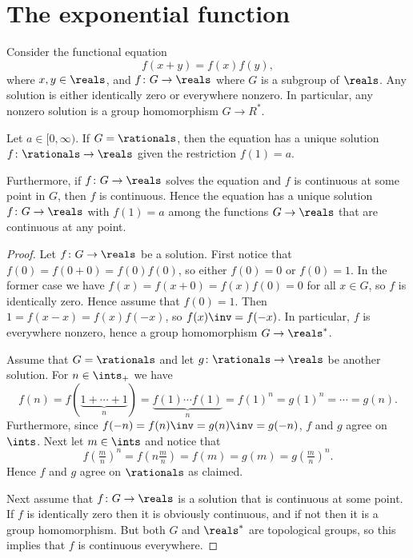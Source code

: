 \documentclass[article, a4paper, 11pt, oneside]{memoir}
\numberwithin{equation}{chapter}
\newcommand{\posints}{\ints_{+}}
\begin{document}
\section{The exponential function}

\begin{lemma}
    Consider the functional equation
    \begin{equation*}
        f(x+y) = f(x)f(y),
    \end{equation*}
    where $x,y \in \reals$, and $f \colon G \to \reals$ where $G$ is a subgroup of $\reals$. Any solution is either identically zero or everywhere nonzero. In particular, any nonzero solution is a group homomorphism $G \to R^*$.
    
    Let $a \in [0,\infty)$. If $G = \rationals$, then the equation has a unique solution $f \colon \rationals \to \reals$ given the restriction $f(1) = a$.

    Furthermore, if $f \colon G \to \reals$ solves the equation and $f$ is continuous at some point in $G$, then $f$ is continuous. Hence the equation has a unique solution $f \colon G \to \reals$ with $f(1) = a$ among the functions $G \to \reals$ that are continuous at any point.
\end{lemma}

\begin{proof}
    Let $f \colon G \to \reals$ be a solution. First notice that $f(0) = f(0+0) = f(0)f(0)$, so either $f(0) = 0$ or $f(0) = 1$. In the former case we have $f(x) = f(x+0) = f(x)f(0) = 0$ for all $x \in G$, so $f$ is identically zero. Hence assume that $f(0) = 1$. Then $1 = f(x-x) = f(x)f(-x)$, so $f(x)\inv = f(-x)$. In particular, $f$ is everywhere nonzero, hence a group homomorphism $G \to \reals^*$.
    
    Assume that $G = \rationals$ and let $g \colon \rationals \to \reals$ be another solution. For $n \in \posints$ we have
    \begin{equation*}
        f(n)
            = f(\underbrace{1 + \cdots + 1}_{n})
            = \underbrace{f(1) \cdots f(1)}_{n}
            = f(1)^n
            = g(1)^n
            = \cdots
            = g(n).
    \end{equation*}
    Furthermore, since $f(-n) = f(n)\inv = g(n)\inv = g(-n)$, $f$ and $g$ agree on $\ints$. Next let $m \in \ints$ and notice that
    \begin{equation*}
        f(\tfrac{m}{n})^n
            = f(n \tfrac{m}{n})
            = f(m)
            = g(m)
            = g(\tfrac{m}{n})^n.
    \end{equation*}
    Hence $f$ and $g$ agree on $\rationals$ as claimed.

    Next assume that $f \colon G \to \reals$ is a solution that is continuous at some point. If $f$ is identically zero then it is obviously continuous, and if not then it is a group homomorphism. But both $G$ and $\reals^*$ are topological groups, so this implies that $f$ is continuous everywhere.
\end{proof}
\end{document}
